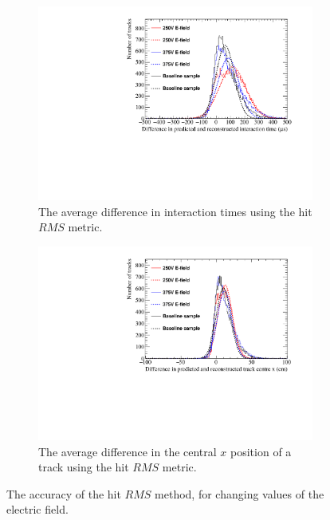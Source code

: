 \begin{figure}[h!]
  \centering
  \begin{subfigure}{0.6\textwidth}
    \centering
    \includegraphics[width=\textwidth]{Canvas_AvDiff_T_RMS_ElecField}
    \caption{The average difference in interaction times using the hit $RMS$ metric.}
    \label{fig:DiffElecStudy_AvDiffRMS_T}
  \end{subfigure}
  \begin{subfigure}{0.6\textwidth}
    \centering
    \includegraphics[width=\textwidth]{Canvas_AvDiff_X_RMS_ElecField}
    \caption{The average difference in the central $x$ position of a track using the hit $RMS$ metric.}
    \label{fig:DiffElecStudy_AvDiffRMS_X}
  \end{subfigure}
  \caption[Comparing the accuracy of the hit $RMS$ method, as the electric field changes]
          {The accuracy of the hit $RMS$ method, for changing values of the electric field. }
  \label{fig:DiffElecStudy_AvDiff_RMS}
\end{figure}

